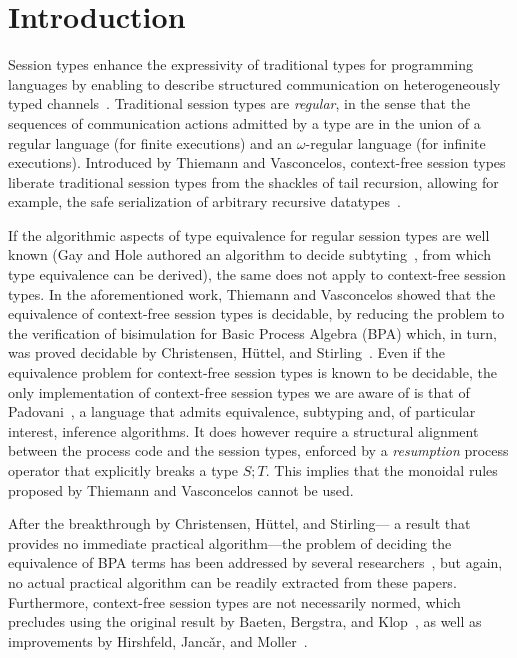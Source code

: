 \section{Introduction}
\label{sec:introduction}

Session types enhance the expressivity of traditional types for
programming languages by enabling to describe structured communication
on heterogeneously typed
channels~\cite{DBLP:conf/concur/Honda93,DBLP:conf/esop/HondaVK98,DBLP:conf/parle/TakeuchiHK94}.
%
Traditional session types are \emph{regular}, in the sense that the
sequences of communication actions admitted by a type are in the union
of a regular language (for finite executions) and an $\omega$-regular
language (for infinite executions).
%
Introduced by Thiemann and Vasconcelos, context-free session types
liberate traditional session types from the shackles of tail
recursion, allowing for example, the safe serialization of arbitrary
recursive datatypes~\cite{thiemann2016context}.

If the algorithmic aspects of type equivalence for regular session
types are well known (Gay and Hole authored an algorithm to decide
subtyting~\cite{DBLP:journals/acta/GayH05}, from which type
equivalence can be derived), the same does not apply to context-free
session types.
%
In the aforementioned work, Thiemann and Vasconcelos showed that the
equivalence of context-free session types is decidable, by reducing
the problem to the verification of bisimulation for Basic Process
Algebra (BPA) which, in turn, was proved decidable by Christensen,
H{\"{u}}ttel, and Stirling~\cite{DBLP:journals/iandc/ChristensenHS95}.
%
Even if the equivalence problem for context-free session types is
known to be decidable, the only implementation of 
context-free session types we are
aware of is that of Padovani~\cite{DBLP:conf/esop/Padovani17}, a
language that admits equivalence, subtyping and, of particular
interest, inference algorithms. It does however require a structural
alignment between the process code and the session types, enforced by
a \emph{resumption} process operator that explicitly breaks a type
$S;T$. This implies that the monoidal rules proposed by Thiemann and
Vasconcelos cannot be used.


After the breakthrough by Christensen, H\"uttel, and Stirling--- a
result that provides no immediate practical algorithm---the problem of
deciding the equivalence of BPA terms has been addressed by several
researchers~\cite{DBLP:conf/mfcs/BurkartCS95,DBLP:journals/iandc/ChristensenHS95,janvcar1999techniques},
but again, no actual practical algorithm can be readily extracted from
these papers.
%
Furthermore, context-free session types are not necessarily normed,
which precludes using the original result by Baeten, Bergstra, and
Klop~\cite{baeten1993decidability}, as well as improvements by Hirshfeld,
Janc\v ar, and
Moller~\cite{DBLP:journals/tcs/HirshfeldJM96,DBLP:conf/concur/HirshfeldM94}.

